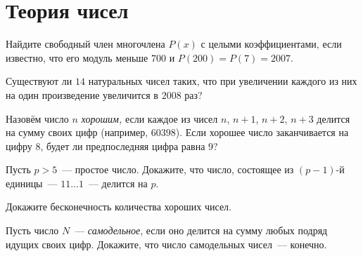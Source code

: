 

\section*{Теория чисел}


\begin{problems}

\item
Найдите свободный член многочлена $P(x)$ с целыми коэффициентами, если
известно, что его модуль меньше $700$ и $P(200) = P(7) = 2007$.
    
\item
Существуют ли $14$ натуральных чисел таких, что при увеличении каждого из них
на один произведение увеличится в $2008$ раз?

\item
Назовём число $n$ \emph{хорошим,} если каждое из чисел $n$, $n+1$, $n+2$, $n+3$
делится на сумму своих цифр (например, $60398$).
Если хорошее число заканчивается на цифру $8$, будет ли предпоследняя цифра
равна $9$?

\item
Пусть $p > 5$~--- простое число.
Докажите, что число, состоящее из $(p - 1)$-й единицы~--- $11 \ldots 1$~---
делится на $p$.

\item
Докажите бесконечность количества хороших чисел.

\item
Пусть число $N$~--- \emph{самодельное}, если оно делится на сумму любых подряд
идущих своих цифр.
Докажите, что число самодельных чисел~--- конечно.

\end{problems}

